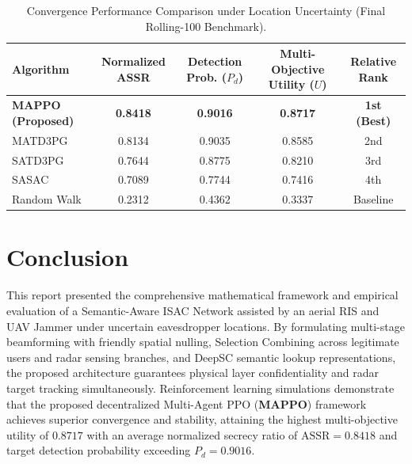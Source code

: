 \documentclass[journal,onecolumn]{IEEEtran}
\begin{document}
\begin{table}[H]
    \centering
    \caption{Convergence Performance Comparison under Location Uncertainty (Final Rolling-100 Benchmark).}
    \label{tab:convergence_results}
    \begin{tabular}{lcccc}
        \toprule
        Algorithm & Normalized ASSR & Detection Prob. ($P_d$) & Multi-Objective Utility ($U$) & Relative Rank \\
        \midrule
        \textbf{MAPPO (Proposed)} & \textbf{0.8418} & \textbf{0.9016} & \textbf{0.8717} & \textbf{1st (Best)} \\
        MATD3PG & 0.8134 & 0.9035 & 0.8585 & 2nd \\
        SATD3PG & 0.7644 & 0.8775 & 0.8210 & 3rd \\
        SASAC & 0.7089 & 0.7744 & 0.7416 & 4th \\
        Random Walk & 0.2312 & 0.4362 & 0.3337 & Baseline \\
        \bottomrule
    \end{tabular}
\end{table}

\section{Conclusion}
This report presented the comprehensive mathematical framework and empirical evaluation of a Semantic-Aware ISAC Network assisted by an aerial RIS and UAV Jammer under uncertain eavesdropper locations. By formulating multi-stage beamforming with friendly spatial nulling, Selection Combining across legitimate users and radar sensing branches, and DeepSC semantic lookup representations, the proposed architecture guarantees physical layer confidentiality and radar target tracking simultaneously. Reinforcement learning simulations demonstrate that the proposed decentralized Multi-Agent PPO (\textbf{MAPPO}) framework achieves superior convergence and stability, attaining the highest multi-objective utility of $\mathbf{0.8717}$ with an average normalized secrecy ratio of $\text{ASSR} = 0.8418$ and target detection probability exceeding $P_d = 0.9016$.


\end{document}
